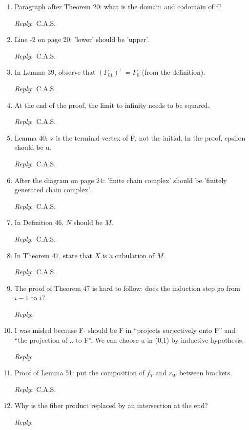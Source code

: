 \documentclass{amsart}
\newcommand{\ar}{\medskip\noindent\textit{Reply}:\ }
\newcommand{\tbw}{\ar \hrulefill}
\newcommand{\cas}{\ar C.A.S.}
\begin{document}
\begin{enumerate}
		Greg. \tbw

		\item Paragraph after Theorem 20: what is the domain and codomain of f?

		\cas

		\item Line -2 on page 20: 'lower' should be 'upper'.

		\cas

		\item In Lemma 39, observe that $(F_{01})^+ = F_0$ (from the definition).

		\cas

		\item At the end of the proof, the limit to infinity needs to be squared.

		\cas

		\item Lemma 40: v is the terminal vertex of F, not the initial. In the proof, epsilon should be u.

		\cas

		\item After the diagram on page 24: 'finite chain complex' should be 'finitely generated chain complex'.

		\cas

		\item In Definition 46, $N$ should be $M$.

		\cas

		\item In Theorem 47, state that $X$ is a cubulation of $M$.

		\cas

		\item The proof of Theorem 47 is hard to follow: does the induction step go from $i-1$ to $i$?

		\tbw

		\item I was misled because F- should be F in “projects surjectively onto F” and “the projection of .. to F”. We can choose u in (0,1) by inductive hypothesis.

		\tbw

		\item Proof of Lemma 51: put the composition of $f_T$ and $r_W$ between brackets.

		\cas

		\item Why is the fiber product replaced by an intersection at the end?

		\tbw


\end{enumerate}
\end{document}
